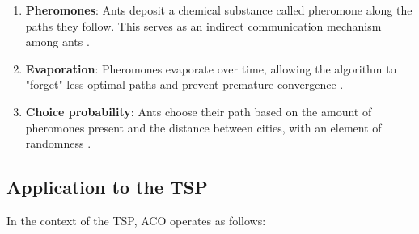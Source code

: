 \begin{enumerate}
	\item \textbf{Pheromones}: Ants deposit a chemical substance called pheromone along the paths they follow. This serves as an indirect communication mechanism among ants \cite{dorigo2006ant}.
	\item \textbf{Evaporation}: Pheromones evaporate over time, allowing the algorithm to "forget" less optimal paths and prevent premature convergence \cite{stutzle2000max}.
	\item \textbf{Choice probability}: Ants choose their path based on the amount of pheromones present and the distance between cities, with an element of randomness \cite{dorigo2004ant}.
\end{enumerate}

\subsection{Application to the \Gls{TSP}}

In the context of the \Gls{TSP}, ACO operates as follows:

